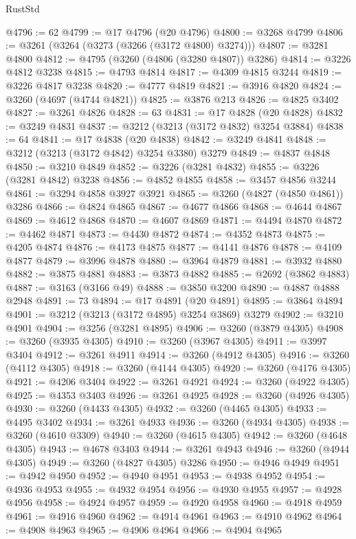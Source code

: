 \begin{lexlean}{RustStd}
\begin{coremodule}
{\begin{coremodule}
{{{{{{{{{{{{{{{{{{{{{{{{{{@4796 := 62
@4799 := @17 @4796 (@20 @4796)
@4800 := @3268 @4799
@4806 := @3261 (@3264 (@3273 (@3266 (@3172 @4800) @3274)))
@4807 := @3281 @4800
@4812 := @4795 (@3260 (@4806 (@3280 @4807)) @3286)
@4814 := @3226 @4812 @3238
@4815 := @4793 @4814
@4817 := @4309 @4815 @3244
@4819 := @3226 @4817 @3238
@4820 := @4777 @4819
@4821 := @3916 @4820
@4824 := @3260 (@4697 (@4744 @4821))
@4825 := @3876 @213
@4826 := @4825 @3402
@4827 := @3261 @4826
@4828 := 63
@4831 := @17 @4828 (@20 @4828)
@4832 := @3249 @4831
@4837 := @3212 (@3213 (@3172 @4832) @3254 @3884)
@4838 := 64
@4841 := @17 @4838 (@20 @4838)
@4842 := @3249 @4841
@4848 := @3212 (@3213 (@3172 @4842) @3254 @3380) @3279
@4849 := @4837 @4848
@4850 := @3210 @4849
@4852 := @3226 (@3281 @4832)
@4855 := @3226 (@3281 @4842) @3238
@4856 := @4852 @4855
@4858 := @3457 @4856 @3244
@4861 := @3294 @4858 @3927 @3921
@4865 := @3260 (@4827 (@4850 @4861)) @3286
@4866 := @4824 @4865
@4867 := @4677 @4866
@4868 := @4644 @4867
@4869 := @4612 @4868
@4870 := @4607 @4869
@4871 := @4494 @4870
@4872 := @4462 @4871
@4873 := @4430 @4872
@4874 := @4352 @4873
@4875 := @4205 @4874
@4876 := @4173 @4875
@4877 := @4141 @4876
@4878 := @4109 @4877
@4879 := @3996 @4878
@4880 := @3964 @4879
@4881 := @3932 @4880
@4882 := @3875 @4881
@4883 := @3873 @4882
@4885 := @2692 (@3862 @4883)
@4887 := @3163 (@3166 @49)
@4888 := @3850 @3200
@4890 := @4887 @4888 @2948
@4891 := 73
@4894 := @17 @4891 (@20 @4891)
@4895 := @3864 @4894
@4901 := @3212 (@3213 (@3172 @4895) @3254 @3869) @3279
@4902 := @3210 @4901
@4904 := @3256 (@3281 @4895)
@4906 := @3260 (@3879 @4305)
@4908 := @3260 (@3935 @4305)
@4910 := @3260 (@3967 @4305)
@4911 := @3997 @3404
@4912 := @3261 @4911
@4914 := @3260 (@4912 @4305)
@4916 := @3260 (@4112 @4305)
@4918 := @3260 (@4144 @4305)
@4920 := @3260 (@4176 @4305)
@4921 := @4206 @3404
@4922 := @3261 @4921
@4924 := @3260 (@4922 @4305)
@4925 := @4353 @3403
@4926 := @3261 @4925
@4928 := @3260 (@4926 @4305)
@4930 := @3260 (@4433 @4305)
@4932 := @3260 (@4465 @4305)
@4933 := @4495 @3402
@4934 := @3261 @4933
@4936 := @3260 (@4934 @4305)
@4938 := @3260 (@4610 @3309)
@4940 := @3260 (@4615 @4305)
@4942 := @3260 (@4648 @4305)
@4943 := @4678 @3403
@4944 := @3261 @4943
@4946 := @3260 (@4944 @4305)
@4949 := @3260 (@4827 @4305) @3286
@4950 := @4946 @4949
@4951 := @4942 @4950
@4952 := @4940 @4951
@4953 := @4938 @4952
@4954 := @4936 @4953
@4955 := @4932 @4954
@4956 := @4930 @4955
@4957 := @4928 @4956
@4958 := @4924 @4957
@4959 := @4920 @4958
@4960 := @4918 @4959
@4961 := @4916 @4960
@4962 := @4914 @4961
@4963 := @4910 @4962
@4964 := @4908 @4963
@4965 := @4906 @4964
@4966 := @4904 @4965
}}}}}}}}}}}}}}}}}}}}}}}}}}
\end{coremodule}}
\end{coremodule}
\end{lexlean}
